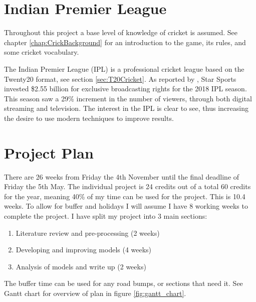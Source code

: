 \documentclass[12pt,a4paper]{report}
\theoremstyle{definition}
\begin{document}
\section{Indian Premier League} \label{sec:IPL}

Throughout this project a base level of knowledge of cricket is assumed. See chapter \ref{chap:CrickBackground} for an introduction to the game, its rules, and some cricket vocabulary. 

The Indian Premier League (IPL) is a professional cricket league based on the Twenty20 format, see section \ref{sec:T20Cricket}. 
As reported by \citet{ESPNcricinfo2018}, Star Sports invested \$2.55 billion for exclusive broadcasting rights for the 2018 IPL season. 
This season saw a 29\% increment in the number of viewers, through both digital streaming and television. 
The interest in the IPL is clear to see, thus increasing the desire to use modern techniques to improve results.

\section{Project Plan}

There are 26 weeks from Friday the 4th November until the final deadline of Friday the 5th May. 
The individual project is 24 credits out of a total 60 credits for the year, meaning 40\% of my time can be used for the project. 
This is 10.4 weeks. 
To allow for buffer and holidays I will assume I have 8 working weeks to complete the project. 
I have split my project into 3 main sections:

\begin{enumerate}
    \item Literature review and pre-processing (2 weeks)
    \item Developing and improving models (4 weeks)
    \item Analysis of models and write up (2 weeks)
\end{enumerate}

The buffer time can be used for any road bumps, or sections that need it. 
See Gantt chart for overview of plan in figure \ref{fig:gantt_chart}.
\end{document}
